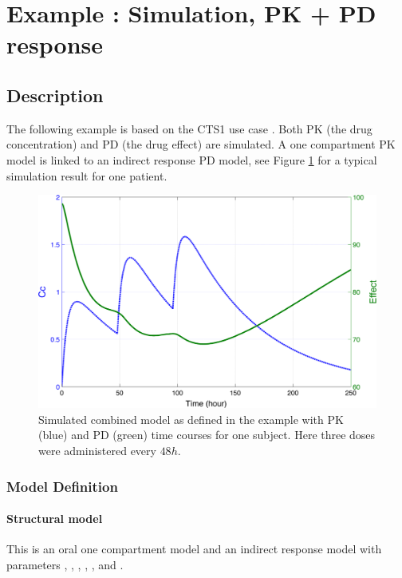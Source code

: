 \section{Example \theexamples: Simulation, PK + PD response}
\label{sec:eg1}

\subsection{Description}

\label{subsec:exp2_intro}

The following example is based on the CTS1 use case
\cite{Lavielle:2011}. Both PK (the drug concentration) and PD (the
drug effect) are simulated. A one compartment PK model is linked to an
indirect response PD model, see Figure \ref{fig:simplePKPD} for a typical 
simulation result for one patient.

\begin{figure}[ht!]
\begin{center}
\includegraphics[width=.45\textwidth]{pics/CTS1_smallPKPD}
\caption{Simulated combined model as defined in the example with PK (blue) and PD (green) time courses for one subject. Here three doses were administered every $48h$.}
\label{fig:simplePKPD}
\vspace{-20pt}
\end{center}
\end{figure}

\subsubsection{Model Definition}

\paragraph{Structural model}
This is an oral one compartment model and an indirect response model
with parameters , , , , ,
 and .

